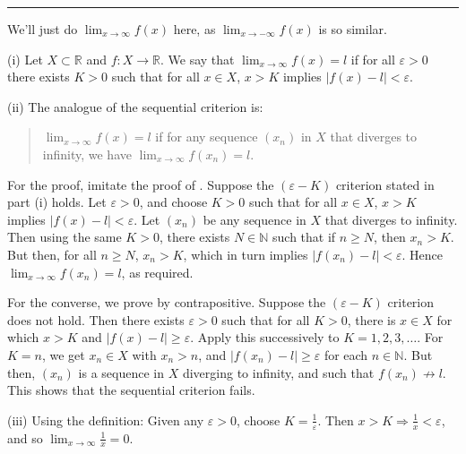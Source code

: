 \documentclass[letterpaper,10pt,english]{jupyterBook}
\begin{document}
\bigskip\hrule\bigskip


\sphinxAtStartPar
{\hyperref[\detokenize{Problems:id11}]{}} We’ll just do \(\displaystyle\lim_{x \rightarrow \infty}f(x)\) here, as \(\displaystyle\lim_{x \rightarrow -\infty}f(x)\) is so similar.

\sphinxAtStartPar
(i) Let \(X\subset\mathbb{R}\) and \(f:X\to\mathbb{R}\). We say that \(\lim_{x \rightarrow \infty}f(x) = l\) if for all \(\varepsilon>0\) there exists \(K>0\) such that for all \(x\in X\), \(x>K\) implies \(|f(x)-l|<\varepsilon\).

\sphinxAtStartPar
(ii) The analogue of the sequential criterion is:
\begin{quote}

\sphinxAtStartPar
\(\lim_{x \rightarrow \infty}f(x) = l\) if for any sequence \((x_{n})\) in \(X\) that diverges to infinity, we have \(\lim_{x \rightarrow \infty}f(x_{n}) = l\).
\end{quote}

\sphinxAtStartPar
For the proof,  imitate the proof of . Suppose the \((\varepsilon- K)\) criterion stated in part (i) holds. Let \(\varepsilon>0\), and choose \(K>0\) such that for all \(x\in X\), \(x>K\) implies \(|f(x)-l|<\varepsilon\).  Let \((x_n)\) be any sequence in \(X\) that diverges to infinity. Then using the same \(K>0\), there exists \(N\in\mathbb{N}\) such that if \(n\geq N\), then \(x_{n} > K\).  But then, for all \(n\geq N\), \(x_n>K\), which in turn implies \(|f(x_{n}) - l| < \varepsilon\). Hence \(\lim_{x \rightarrow \infty}f(x_{n}) = l\), as required.

\sphinxAtStartPar
For the converse, we prove by contrapositive. Suppose the \((\varepsilon-K)\) criterion does not hold. Then there exists \(\varepsilon>0\) such that for all \(K>0\), there is \(x\in X\) for which \(x>K\) and \(|f(x)-l|\geq \varepsilon\). Apply this successively to \(K = 1, 2, 3, \ldots\). For \(K=n\), we get \(x_n\in X\) with \(x_{n} > n\), and \(|f(x_{n}) - l| \geq \varepsilon\) for each \(n\in\mathbb{N}\). But then, \((x_n)\) is a sequence in \(X\) diverging to infinity, and such that \(f(x_n)\nrightarrow l\). This shows that the sequential criterion fails.

\sphinxAtStartPar
(iii) Using the definition: Given any \(\varepsilon > 0\), choose \(K = \frac{1}{\varepsilon}\). Then \(x > K \Rightarrow \frac{1}{x} < \varepsilon\), and so \(\lim_{x\to\infty} \frac{1}{x}=0\).
\end{document}
